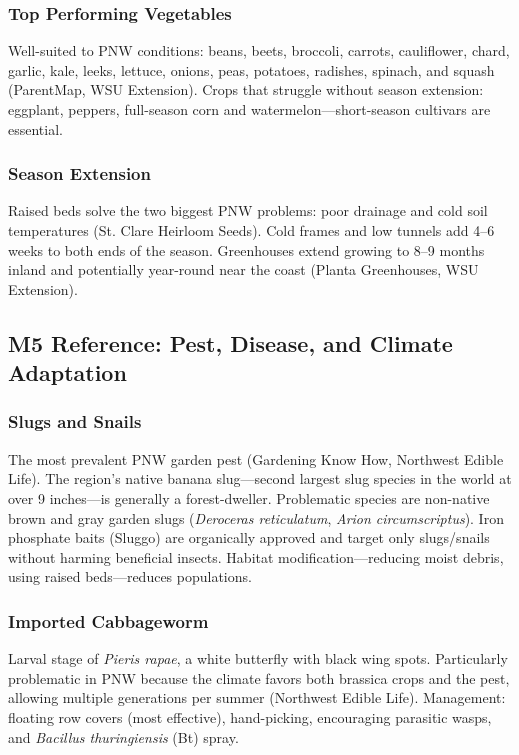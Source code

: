 \documentclass[11pt,letterpaper]{article}
\begin{document}
\subsubsection{Top Performing Vegetables}

Well-suited to PNW conditions: beans, beets, broccoli, carrots, cauliflower, chard, garlic, kale, leeks, lettuce, onions, peas, potatoes, radishes, spinach, and squash (ParentMap, WSU Extension). Crops that struggle without season extension: eggplant, peppers, full-season corn and watermelon---short-season cultivars are essential.

\subsubsection{Season Extension}

Raised beds solve the two biggest PNW problems: poor drainage and cold soil temperatures (St. Clare Heirloom Seeds). Cold frames and low tunnels add 4--6 weeks to both ends of the season. Greenhouses extend growing to 8--9 months inland and potentially year-round near the coast (Planta Greenhouses, WSU Extension).

\subsection{M5 Reference: Pest, Disease, and Climate Adaptation}

\subsubsection{Slugs and Snails}

The most prevalent PNW garden pest (Gardening Know How, Northwest Edible Life). The region's native banana slug---second largest slug species in the world at over 9 inches---is generally a forest-dweller. Problematic species are non-native brown and gray garden slugs (\textit{Deroceras reticulatum}, \textit{Arion circumscriptus}). Iron phosphate baits (Sluggo) are organically approved and target only slugs/snails without harming beneficial insects. Habitat modification---reducing moist debris, using raised beds---reduces populations.

\subsubsection{Imported Cabbageworm}

Larval stage of \textit{Pieris rapae}, a white butterfly with black wing spots. Particularly problematic in PNW because the climate favors both brassica crops and the pest, allowing multiple generations per summer (Northwest Edible Life). Management: floating row covers (most effective), hand-picking, encouraging parasitic wasps, and \textit{Bacillus thuringiensis} (Bt) spray.
\end{document}

